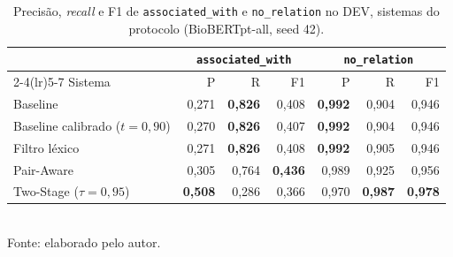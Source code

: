\begin{table}[htbp]
  \centering
  \caption{Precisão, \emph{recall} e F1 de \texttt{associated\_with} e \texttt{no\_relation} no DEV, sistemas do protocolo (BioBERTpt-all, seed 42).}
  \label{tab:dev_outras}
  \begin{tabular}{lrrrrrr}
  \toprule
  & \multicolumn{3}{c}{\texttt{associated\_with}} & \multicolumn{3}{c}{\texttt{no\_relation}} \\
  \cmidrule(lr){2-4}\cmidrule(lr){5-7}
  Sistema & P & R & F1 & P & R & F1 \\
  \midrule
Baseline & 0{,}271 & \textbf{0{,}826} & 0{,}408 & \textbf{0{,}992} & 0{,}904 & 0{,}946 \\
Baseline calibrado ($t=0{,}90$) & 0{,}270 & \textbf{0{,}826} & 0{,}407 & \textbf{0{,}992} & 0{,}904 & 0{,}946 \\
Filtro léxico & 0{,}271 & \textbf{0{,}826} & 0{,}408 & \textbf{0{,}992} & 0{,}905 & 0{,}946 \\
Pair-Aware & 0{,}305 & 0{,}764 & \textbf{0{,}436} & 0{,}989 & 0{,}925 & 0{,}956 \\
Two-Stage ($\tau=0{,}95$) & \textbf{0{,}508} & 0{,}286 & 0{,}366 & 0{,}970 & \textbf{0{,}987} & \textbf{0{,}978} \\
  \bottomrule
  \end{tabular}\\[4pt]
  {\footnotesize Fonte: elaborado pelo autor.}
\end{table}
